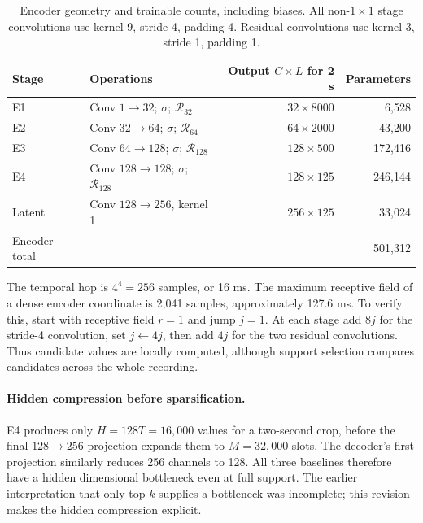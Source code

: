 \documentclass[11pt,a4paper]{article}
\begin{document}
\begin{table}[htbp]
\centering\small
\begin{tabular}{llrr}
\toprule
Stage & Operations & Output $C\times L$ for 2 s & Parameters \\
\midrule
E1 & Conv $1\to32$; $\sigma$; $\mathcal R_{32}$ & $32\times8000$ & 6,528 \\
E2 & Conv $32\to64$; $\sigma$; $\mathcal R_{64}$ & $64\times2000$ & 43,200 \\
E3 & Conv $64\to128$; $\sigma$; $\mathcal R_{128}$ & $128\times500$ & 172,416 \\
E4 & Conv $128\to128$; $\sigma$; $\mathcal R_{128}$ & $128\times125$ & 246,144 \\
Latent & Conv $128\to256$, kernel 1 & $256\times125$ & 33,024 \\
\midrule
Encoder total &&& 501,312 \\
\bottomrule
\end{tabular}
\caption{Encoder geometry and trainable counts, including biases. All non-$1\times1$ stage convolutions use kernel 9, stride 4, padding 4. Residual convolutions use kernel 3, stride 1, padding 1.}
\label{tab:encoder}
\end{table}

The temporal hop is $4^4=256$ samples, or 16 ms. The maximum receptive field of a dense encoder coordinate is 2,041 samples, approximately 127.6 ms. To verify this, start with receptive field $r=1$ and jump $j=1$. At each stage add $8j$ for the stride-4 convolution, set $j\leftarrow4j$, then add $4j$ for the two residual convolutions. Thus candidate values are locally computed, although support selection compares candidates across the whole recording.

\paragraph{Hidden compression before sparsification.}
E4 produces only $H=128T=16{,}000$ values for a two-second crop, before the final $128\to256$ projection expands them to $M=32{,}000$ slots. The decoder's first projection similarly reduces 256 channels to 128. All three baselines therefore have a hidden dimensional bottleneck even at full support. The earlier interpretation that only top-$k$ supplies a bottleneck was incomplete; this revision makes the hidden compression explicit.
\end{document}
